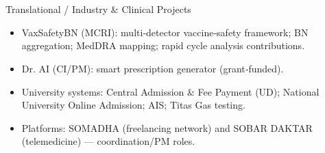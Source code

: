 \section{\faBuilding}{Translational / Industry \& Clinical Projects}
    
\begin{itemize}[noitemsep]
    \item VaxSafetyBN (MCRI): multi‑detector vaccine‑safety framework; BN aggregation; MedDRA mapping; rapid cycle analysis contributions.
    \item Dr. AI (CI/PM): smart prescription generator (grant‑funded).
    \item University systems: Central Admission \& Fee Payment (UD); National University Online Admission; AIS; Titas Gas testing.
    \item Platforms: SOMADHA (freelancing network) and SOBAR DAKTAR (telemedicine) — coordination/PM roles.

\end{itemize}